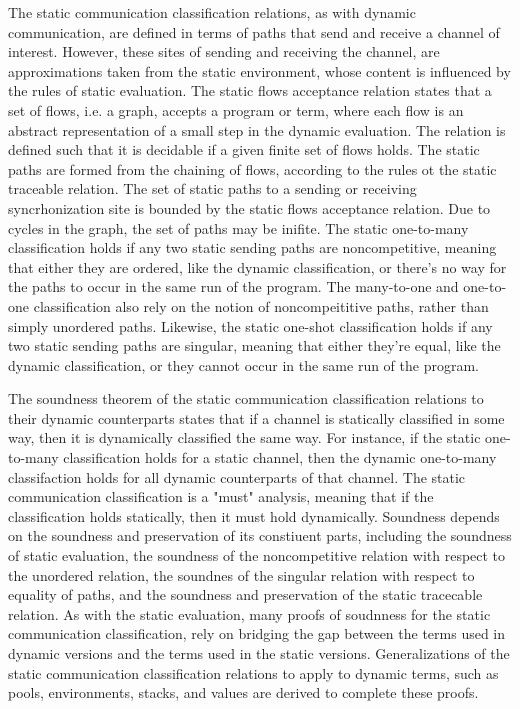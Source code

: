 \documentclass[letterpaper, 11pt]{extarticle}
\begin{document}
The static communication classification relations, as with dynamic communication, are defined in terms of paths
that send and receive a channel of interest. However, these sites of sending and receiving the channel, are approximations
taken from the static environment, whose content is influenced by the rules of static evaluation.
The static flows acceptance relation states that a set of flows, i.e. a graph, accepts a program or term, where each flow is
an abstract representation of a small step in the dynamic evaluation. The relation is defined such that
it is decidable if a given finite set of flows holds. The static paths are formed from the chaining of flows, according
to the rules ot the static traceable relation.
The set of static paths to a sending or receiving syncrhonization site is bounded by the static flows acceptance
relation. Due to cycles in the graph, the set of paths may be inifite. 
The static one-to-many classification holds if any two static sending paths are noncompetitive, meaning
that either they are ordered, like the dynamic classification, or there's no way for the paths to occur in the same run
of the program. The many-to-one and one-to-one classification also rely on the notion of noncompeititive paths, rather than
simply unordered paths. Likewise, the static one-shot classification holds if any two static sending paths are singular,
meaning that either they're equal, like the dynamic classification, or they cannot occur in the same run of the program.

The soundness theorem of the static communication classification relations to their dynamic counterparts states that if
a channel is statically classified in some way, then it is dynamically classified the same way.  For instance, if the
static one-to-many classification holds for a static channel, then the dynamic one-to-many classifaction holds for
all dynamic counterparts of that channel.  The static communication classification is a "must" analysis, meaning that
if the classification holds statically, then it must hold dynamically. Soundness depends on the soundness and preservation
of its constiuent parts,
including the soundness of static evaluation, the soundness of the noncompetitive relation with respect to
the unordered relation, the soundnes of the singular relation with respect to equality of paths,
and the soundness and preservation of the static tracecable relation. As with the static evaluation, many proofs of
soudnness for the static communication classification, rely on bridging the gap between the terms used in dynamic
versions and the terms used in the static versions. Generalizations of the static communication classification relations to
apply to dynamic terms, such as pools, environments, stacks, and values are derived to complete these proofs.
\end{document}

